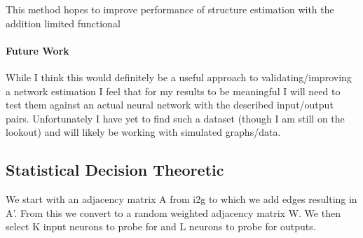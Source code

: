 \documentclass[12pt]{article}
\begin{document}
This method hopes to improve performance of structure estimation with the addition limited functional 

\paragraph{Future Work}

While I think this would definitely be a useful approach to validating/improving a network estimation I feel that for my results to be meaningful I will need to test them against an actual neural network with the described input/output pairs. Unfortunately I have yet to find such a dataset (though I am still on the lookout) and will likely be working with simulated graphs/data.

\pagebreak


\subsection*{Statistical Decision Theoretic}

We start with an adjacency matrix A from i2g to which we add edges resulting in A'. From this we convert to a random weighted adjacency matrix W. We then select K  input neurons to probe for and L neurons to probe for outputs.
\end{document}
